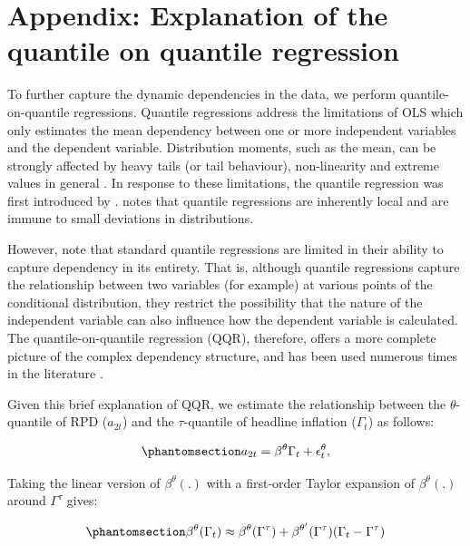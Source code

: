 \documentclass[
  letterpaper,
  DIV=11,
  numbers=noendperiod]{scrartcl}
\begin{document}
\setcounter{equation}{0}
\renewcommand{\theequation}{D\arabic{equation}}

\section{Appendix: Explanation of the quantile on quantile
regression}\label{appendix-explanation-of-the-quantile-on-quantile-regression}

To further capture the dynamic dependencies in the data, we perform
quantile-on-quantile regressions. Quantile regressions address the
limitations of OLS which only estimates the mean dependency between one
or more independent variables and the dependent variable. Distribution
moments, such as the mean, can be strongly affected by heavy tails (or
tail behaviour), non-linearity and extreme values in general
\citep[see][]{koenker2017}. In response to these limitations, the
quantile regression was first introduced by \citet{koenker1978a}.
\citet{koenker2017} notes that quantile regressions are inherently local
and are immune to small deviations in distributions.

However, \citet{gupta2018} note that standard quantile regressions are
limited in their ability to capture dependency in its entirety. That is,
although quantile regressions capture the relationship between two
variables (for example) at various points of the conditional
distribution, they restrict the possibility that the nature of the
independent variable can also influence how the dependent variable is
calculated. The quantile-on-quantile regression (QQR), therefore, offers
a more complete picture of the complex dependency structure, and has
been used numerous times in the literature
\citep[see][]{mishra2019, chang2020, sim2016}.

Given this brief explanation of QQR, we estimate the relationship
between the \(\theta\)-quantile of RPD (\(a_{2t}\)) and the
\(\tau\)-quantile of headline inflation (\(\Gamma_t\)) as follows:

\begin{equation}\phantomsection\label{eq-qqr_1}{
    a_{2t} = \beta^\theta\Gamma_t + \epsilon_{t}^\theta, 
}\end{equation}

Taking the linear version of \(\beta^\theta(.)\) with a first-order
Taylor expansion of \(\beta^\theta(.)\) around \(\Gamma^\tau\) gives:

\begin{equation}\phantomsection\label{eq-qqr_2}{
    \beta^\theta(\Gamma_t) \approx \beta^\theta(\Gamma^\tau) + \beta^{\theta'}(\Gamma^\tau)(\Gamma_t - \Gamma^\tau)
}\end{equation}
\end{document}
